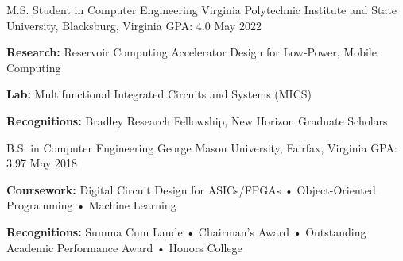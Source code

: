 


\begin{cventries}

\cventry
{M.S. Student in Computer Engineering} %
{Virginia Polytechnic Institute and State University, Blacksburg, Virginia} %
{GPA: 4.0 } %
{May 2022} %
{
\begin{cvitems}
\item {\textbf{Research:} Reservoir Computing Accelerator Design for Low-Power, Mobile Computing}
\item {\textbf{Lab:} Multifunctional Integrated Circuits and Systems (MICS)}
\item {\textbf{Recognitions:} Bradley Research Fellowship, New Horizon Graduate Scholars}
\end{cvitems}
}
\cventry
{B.S. in Computer Engineering} %
{George Mason University, Fairfax, Virginia} %
{GPA: 3.97 } %
{May 2018} %
{
\begin{cvitems}
\item {\textbf{Coursework:} Digital Circuit Design for ASICs/FPGAs • Object-Oriented Programming • Machine Learning}
\item {\textbf{Recognitions:} Summa Cum Laude • Chairman's Award • Outstanding Academic Performance Award • Honors College}
\end{cvitems}
}


\end{cventries}